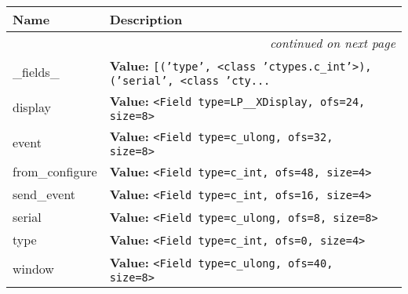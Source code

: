     \vspace{-1cm}
\hspace{\varindent}\begin{longtable}{|p{\varnamewidth}|p{\vardescrwidth}|l}
\cline{1-2}
\cline{1-2} \centering \textbf{Name} & \centering \textbf{Description}& \\
\cline{1-2}
\endhead\cline{1-2}\multicolumn{3}{r}{\small\textit{continued on next page}}\\\endfoot\cline{1-2}
\endlastfoot\raggedright \_\-f\-i\-e\-l\-d\-s\-\_\- & \raggedright \textbf{Value:} 
{\tt \texttt{[}\texttt{(}\texttt{'}\texttt{type}\texttt{'}\texttt{, }{\textless}class 'ctypes.c\_int'{\textgreater}\texttt{)}\texttt{, }\texttt{(}\texttt{'}\texttt{serial}\texttt{'}\texttt{, }{\textless}class 'cty\texttt{...}}&\\
\cline{1-2}
\raggedright d\-i\-s\-p\-l\-a\-y\- & \raggedright \textbf{Value:} 
{\tt {\textless}Field type=LP\_\_XDisplay, ofs=24, size=8{\textgreater}}&\\
\cline{1-2}
\raggedright e\-v\-e\-n\-t\- & \raggedright \textbf{Value:} 
{\tt {\textless}Field type=c\_ulong, ofs=32, size=8{\textgreater}}&\\
\cline{1-2}
\raggedright f\-r\-o\-m\-\_\-c\-o\-n\-f\-i\-g\-u\-r\-e\- & \raggedright \textbf{Value:} 
{\tt {\textless}Field type=c\_int, ofs=48, size=4{\textgreater}}&\\
\cline{1-2}
\raggedright s\-e\-n\-d\-\_\-e\-v\-e\-n\-t\- & \raggedright \textbf{Value:} 
{\tt {\textless}Field type=c\_int, ofs=16, size=4{\textgreater}}&\\
\cline{1-2}
\raggedright s\-e\-r\-i\-a\-l\- & \raggedright \textbf{Value:} 
{\tt {\textless}Field type=c\_ulong, ofs=8, size=8{\textgreater}}&\\
\cline{1-2}
\raggedright t\-y\-p\-e\- & \raggedright \textbf{Value:} 
{\tt {\textless}Field type=c\_int, ofs=0, size=4{\textgreater}}&\\
\cline{1-2}
\raggedright w\-i\-n\-d\-o\-w\- & \raggedright \textbf{Value:} 
{\tt {\textless}Field type=c\_ulong, ofs=40, size=8{\textgreater}}&\\
\cline{1-2}
\end{longtable}



